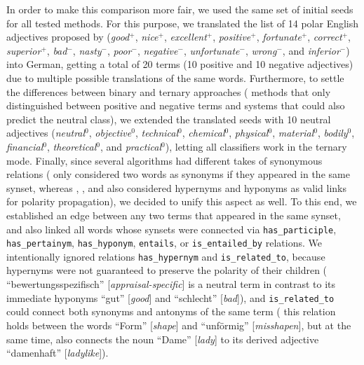 In order to make this comparison more fair, we used the same set of
initial seeds for all tested methods.  For this purpose, we translated
the list of 14 polar English adjectives proposed by \citet{Turney:03}
(\emph{good}$^+$, \emph{nice}$^+$, \emph{excellent}$^+$,
\emph{positive}$^+$, \emph{fortunate}$^+$, \emph{correct}$^+$,
\emph{superior}$^+$, \emph{bad}$^-$, \emph{nasty}$^-$,
\emph{poor}$^-$, \emph{negative}$^-$, \emph{unfortunate}$^-$,
\emph{wrong}$^-$, and \emph{inferior}$^-$) into German, getting a
total of 20 terms (10 positive and 10 negative adjectives) due to
multiple possible translations of the same words.  Furthermore, to
settle the differences between binary and ternary approaches (\ie{}
methods that only distinguished between positive and negative terms
and systems that could also predict the neutral class), we extended
the translated seeds with 10 neutral adjectives (\emph{neutral}$^0$,
\emph{objective}$^0$, \emph{technical}$^0$, \emph{chemical}$^0$,
\emph{physical}$^0$, \emph{material}$^0$, \emph{bodily}$^0$,
\emph{financial}$^0$, \emph{theoretical}$^0$, and
\emph{practical}$^0$), letting all classifiers work in the ternary
mode.  Finally, since several algorithms had different takes of
synonymous relations (\eg{} \citeauthor{Hu:04} only considered two
words as synonyms if they appeared in the same synset, whereas
\citeauthor{Esuli:06c}, \citeauthor{Rao:09}, and
\citeauthor{Awadallah:10} also considered hypernyms and hyponyms as
valid links for polarity propagation), we decided to unify this aspect
as well.  To this end, we established an edge between any two terms
that appeared in the same synset, and also linked all words whose
synsets were connected via \texttt{has\_participle},
\texttt{has\_pertainym}, \texttt{has\_hyponym}, \texttt{entails}, or
\texttt{is\_entailed\_by} relations. We intentionally ignored
relations \texttt{has\_hypernym} and \texttt{is\_related\_to}, because
hypernyms were not guaranteed to preserve the polarity of their
children (\eg{} ``bewertungsspezifisch'' [\emph{appraisal-specific}]
is a neutral term in contrast to its immediate hyponyms ``gut''
[\emph{good}] and ``schlecht'' [\emph{bad}]), and
\texttt{is\_related\_to} could connect both synonyms and antonyms of
the same term (\eg{} this relation holds between the words ``Form''
[\emph{shape}] and ``unf\"ormig'' [\emph{misshapen}], but at the same
time, also connects the noun ``Dame'' [\emph{lady}] to its derived
adjective ``damenhaft'' [\emph{ladylike}]).

